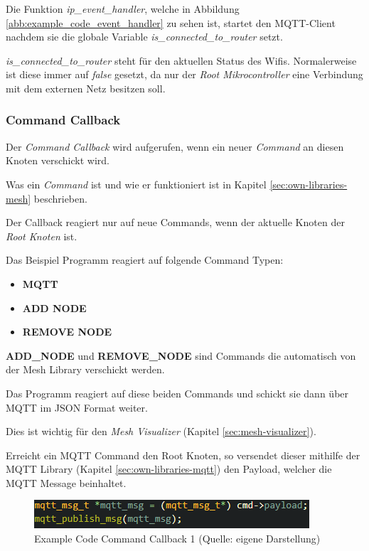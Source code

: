 Die Funktion \textit{ip\_event\_handler}, welche in Abbildung \ref{abb:example_code_event_handler} zu sehen ist, startet den MQTT-Client nachdem sie die globale Variable \textit{is\_connected\_to\_router} setzt.

\textit{is\_connected\_to\_router} steht für den aktuellen Status des Wifis. Normalerweise ist diese immer auf \textit{false} gesetzt, da nur der \textit{Root Mikrocontroller} eine Verbindung mit dem externen Netz besitzen soll.

\subsubsection{Command Callback}

Der \textit{Command Callback} wird aufgerufen, wenn ein neuer \textit{Command} an diesen Knoten verschickt wird.

Was ein \textit{Command} ist und wie er funktioniert ist in Kapitel \ref{sec:own-libraries-mesh} beschrieben.

Der Callback reagiert nur auf neue Commands, wenn der aktuelle Knoten der \textit{Root Knoten} ist.

Das Beispiel Programm reagiert auf folgende Command Typen:

\begin{itemize}
    \item \textbf{MQTT}
    \item \textbf{ADD NODE}
    \item \textbf{REMOVE NODE}
\end{itemize}

\textbf{ADD\_NODE} und \textbf{REMOVE\_NODE} sind Commands die automatisch von der Mesh Library verschickt werden.

Das Programm reagiert auf diese beiden Commands und schickt sie dann über MQTT im JSON Format weiter.

Dies ist wichtig für den \textit{Mesh Visualizer} (Kapitel \ref{sec:mesh-visualizer}).

Erreicht ein MQTT Command den Root Knoten, so versendet dieser mithilfe der MQTT Library (Kapitel \ref{sec:own-libraries-mqtt}) den Payload, welcher die MQTT Message beinhaltet.

\begin{figure}[H]
    \begin{center}
        \includegraphics[scale=0.8]{images/example_code_on_cmd_one.png}
        \caption{Example Code Command Callback 1 (Quelle: eigene Darstellung)}
        \label{abb:example_code_on_cmd_one}
    \end{center}
\end{figure}


